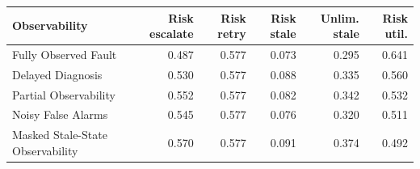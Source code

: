 \begin{tabular}{lrrrrr}
\toprule
Observability & Risk escalate & Risk retry & Risk stale & Unlim. stale & Risk util. \\
\midrule
Fully Observed Fault & 0.487 & 0.577 & 0.073 & 0.295 & 0.641 \\
Delayed Diagnosis & 0.530 & 0.577 & 0.088 & 0.335 & 0.560 \\
Partial Observability & 0.552 & 0.577 & 0.082 & 0.342 & 0.532 \\
Noisy False Alarms & 0.545 & 0.577 & 0.076 & 0.320 & 0.511 \\
Masked Stale-State Observability & 0.570 & 0.577 & 0.091 & 0.374 & 0.492 \\
\bottomrule
\end{tabular}
